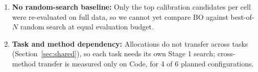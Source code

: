 \documentclass[11pt]{article}
\begin{document}
\begin{enumerate}
\item \textbf{No random-search baseline:} Only the top calibration candidates per cell were re-evaluated on full data, so we cannot yet compare BO against best-of-$N$ random search at equal evaluation budget.
\item \textbf{Task and method dependency:} Allocations do not transfer across tasks (Section~\ref{sec:shared}), so each task needs its own Stage 1 search; cross-method transfer is measured only on Code, for 4 of 6 planned configurations.
\end{enumerate}

\FloatBarrier




\end{document}

